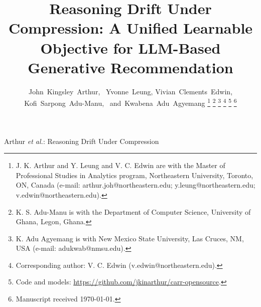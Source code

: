 \documentclass[lettersize,journal]{IEEEtran}
\begin{document}
\title{Reasoning Drift Under Compression:
  A Unified Learnable Objective for LLM-Based Generative Recommendation}

\author{John~Kingsley~Arthur,~
        Yvonne~Leung,
        Vivian~Clements~Edwin,
        Kofi~Sarpong~Adu-Manu,~
        and~Kwabena~Adu~Agyemang%
\thanks{J. K. Arthur and Y. Leung and V. C. Edwin are with the
Master of Professional Studies in Analytics program, Northeastern
University, Toronto, ON, Canada
(e-mail: arthur.joh@northeastern.edu; y.leung@northeastern.edu;
v.edwin@northeastern.edu).}%
\thanks{K. S. Adu-Manu is with the Department of Computer Science,
University of Ghana, Legon, Ghana.}%
\thanks{K. Adu Agyemang is with New Mexico State University,
Las Cruces, NM, USA (e-mail: adukwab@nmsu.edu).}%
\thanks{Corresponding author: V. C. Edwin (v.edwin@northeastern.edu).}%
\thanks{Code and models:
\protect\url{https://github.com/jkinarthur/carr-opensource}.}%
\thanks{Manuscript received \today.}}

%
{Arthur \MakeLowercase{\textit{et al.}}: Reasoning Drift Under Compression}


\maketitle
\end{document}
